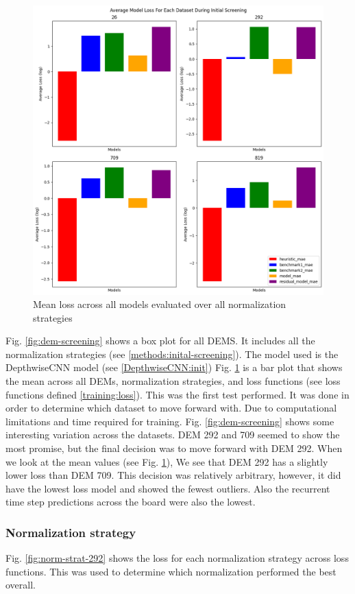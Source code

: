 \begin{figure}[htbp]
	\centering
	\includegraphics[width=0.9\linewidth, height=0.7\linewidth]{"Figures/Results/Initial screening/DEM screening plots/Data_Set_Dem_Screening_Log"}
	\caption[Mean Loss Across DEMs]{Mean loss across all models evaluated over all normalization strategies}
	\label{fig:mean-dem-screening}
\end{figure}

Fig. \ref{fig:dem-screening} shows a box plot for all DEMS. It includes all the normalization strategies (see \ref{methods:inital-screening}). The model used is the DepthwiseCNN model (see \ref{DepthwiseCNN:init}) Fig. \ref{fig:mean-dem-screening} is a bar plot that shows the mean across all DEMs, normalization strategies, and loss functions (see loss functions defined \ref{training:loss}). This was the first test performed. It was done in order to determine which dataset to move forward with. Due to computational limitations and time required for training. Fig. \ref{fig:dem-screening} shows some interesting variation across the datasets. DEM 292 and 709 seemed to show the most promise, but the final decision was to move forward with DEM 292. When we look at the mean values (see Fig. \ref{fig:mean-dem-screening}), We see that DEM 292 has a slightly lower loss than DEM 709. This decision was relatively arbitrary, however, it did have the lowest loss model and showed the fewest outliers. Also the recurrent time step predictions across the board were also the lowest.

\subsubsection*{Normalization strategy}
Fig. \ref{fig:norm-strat-292} shows the loss for each normalization strategy across loss functions. This was used to determine which normalization performed the best overall.

